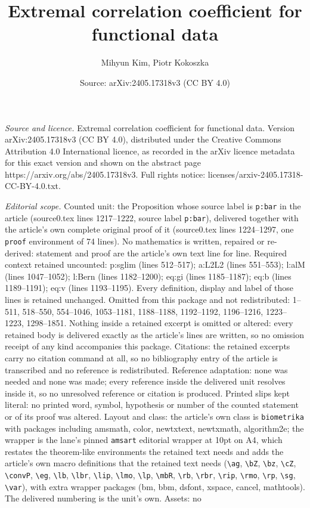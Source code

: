 \documentclass[10pt,a4paper]{amsart}
\title[Extremal correlation coefficient for functional data]{Extremal correlation coefficient for functional data}
\author{Mihyun Kim, Piotr Kokoszka}
\date{Source: arXiv:2405.17318v3 (CC BY 4.0)}
\begin{document}
\maketitle

\noindent\emph{Source and licence.} Extremal correlation coefficient for functional data. Version arXiv:2405.17318v3 (CC BY 4.0), distributed under the Creative Commons Attribution 4.0 International licence, as recorded in the arXiv licence metadata for this exact version and shown on the abstract page https://arxiv.org/abs/2405.17318v3. Full rights notice: licenses/arxiv-2405.17318-CC-BY-4.0.txt.\par\smallskip

\noindent\textit{Editorial scope.} Counted unit: the Proposition whose source label is \texttt{p:bar} in the article (source0.tex lines 1217--1222, source label \texttt{p:bar}), delivered together with the article's own complete original proof of it (source0.tex lines 1224--1297, one \texttt{proof} environment of 74 lines). No mathematics is written, repaired or re-derived: statement and proof are the article's own text line for line. Required context retained uncounted: p:sglim (lines 512--517); a:L2L2 (lines 551--553); l:alM (lines 1047--1052); l:Bern (lines 1182--1200); eq:gi (lines 1185--1187); eq:b (lines 1189--1191); eq:v (lines 1193--1195). Every definition, display and label of those lines is retained unchanged. Omitted from this package and not redistributed: 1--511, 518--550, 554--1046, 1053--1181, 1188--1188, 1192--1192, 1196--1216, 1223--1223, 1298--1851. Nothing inside a retained excerpt is omitted or altered: every retained body is delivered exactly as the article's lines are written, so no omission receipt of any kind accompanies this package. Citations: the retained excerpts carry no citation command at all, so no bibliography entry of the article is transcribed and no reference is redistributed. Reference adaptation: none was needed and none was made; every reference inside the delivered unit resolves inside it, so no unresolved reference or citation is produced. Printed slips kept literal: no printed word, symbol, hypothesis or number of the counted statement or of its proof was altered. Layout and class: the article's own class is \texttt{biometrika} with packages including amsmath, color, newtxtext, newtxmath, algorithm2e; the wrapper is the lane's pinned \texttt{amsart} editorial wrapper at 10pt on A4, which restates the theorem-like environments the retained text needs and adds the article's own macro definitions that the retained text needs (\texttt{\textbackslash ag}, \texttt{\textbackslash bZ}, \texttt{\textbackslash bz}, \texttt{\textbackslash cZ}, \texttt{\textbackslash convP}, \texttt{\textbackslash eg}, \texttt{\textbackslash lb}, \texttt{\textbackslash lbr}, \texttt{\textbackslash lip}, \texttt{\textbackslash lmo}, \texttt{\textbackslash lp}, \texttt{\textbackslash mbR}, \texttt{\textbackslash rb}, \texttt{\textbackslash rbr}, \texttt{\textbackslash rip}, \texttt{\textbackslash rmo}, \texttt{\textbackslash rp}, \texttt{\textbackslash sg}, \texttt{\textbackslash var}), with extra wrapper packages (bm, bbm, dsfont, xspace, cancel, mathtools). The delivered numbering is the unit's own. Assets: no 
\end{document}
